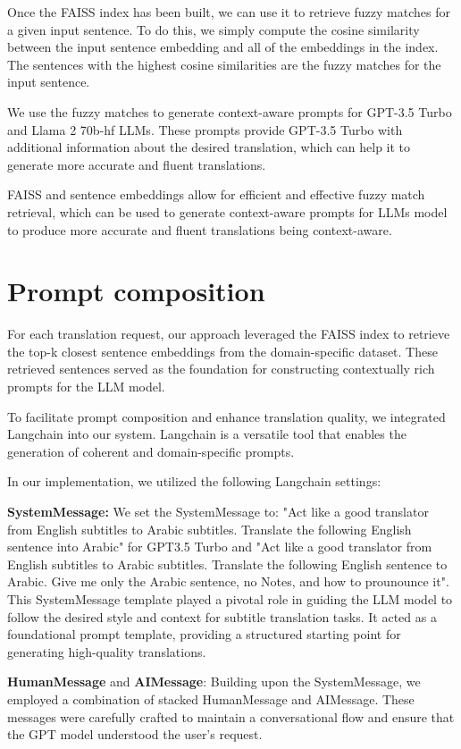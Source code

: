 \documentclass[twocolumn]{article}
\begin{document}
Once the FAISS index has been built, we can use it to retrieve fuzzy matches for a given input sentence. To do this, we simply compute the cosine similarity between the input sentence embedding and all of the embeddings in the index. The sentences with the highest cosine similarities are the fuzzy matches for the input sentence.

We use the fuzzy matches to generate context-aware prompts for GPT-3.5 Turbo and Llama 2 70b-hf LLMs. These prompts provide GPT-3.5 Turbo with additional information about the desired translation, which can help it to generate more accurate and fluent translations.

FAISS and sentence embeddings allow for efficient and effective fuzzy match retrieval, which can be used to generate context-aware prompts for LLMs model to produce more accurate and fluent translations being context-aware.


\section{Prompt composition}

For each translation request, our approach leveraged the FAISS index to retrieve the top-k closest sentence embeddings from the domain-specific dataset. These retrieved sentences served as the foundation for constructing contextually rich prompts for the LLM model.


To facilitate prompt composition and enhance translation quality, we integrated Langchain into our system. Langchain is a versatile tool that enables the generation of coherent and domain-specific prompts. 

In our implementation, we utilized the following Langchain settings:

\textbf{SystemMessage:} We set the SystemMessage to: "Act like a good translator from English subtitles to Arabic subtitles. Translate the following English sentence into Arabic" for GPT3.5 Turbo and "Act like a good translator from English subtitles to Arabic subtitles. Translate the following English sentence to Arabic. Give me only the Arabic sentence, no Notes, and how to prounounce it". This SystemMessage template played a pivotal role in guiding the LLM model to follow the desired style and context for subtitle translation tasks. It acted as a foundational prompt template, providing a structured starting point for generating high-quality translations.
	

\textbf{HumanMessage} and \textbf{AIMessage}: Building upon the SystemMessage, we employed a combination of stacked HumanMessage and AIMessage. These messages were carefully crafted to maintain a conversational flow and ensure that the GPT model understood the user’s request.
\end{document}
